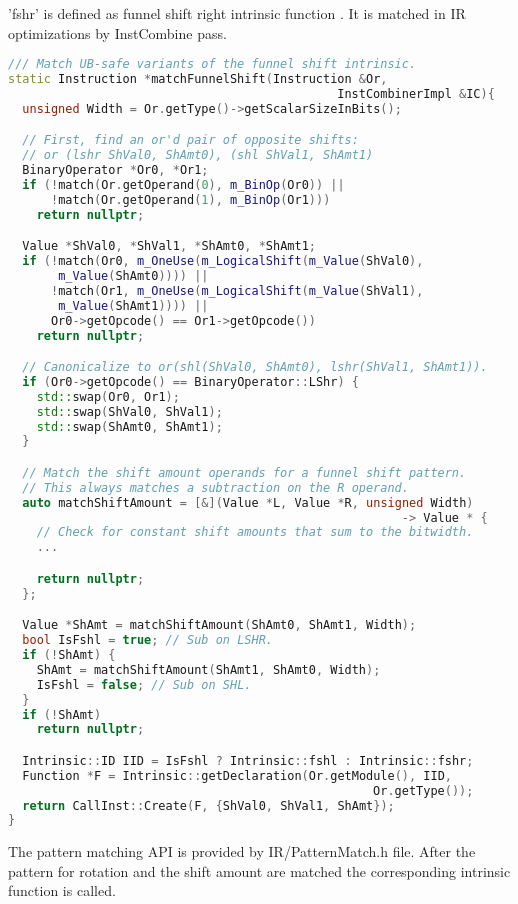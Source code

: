 'fshr' is defined as funnel shift right intrinsic function \cite{llvmref-fshl}. It is matched in IR optimizations by InstCombine pass.

\begin{lstlisting}[language=C++, caption={Funnel Shift Right Pattern Matching}]
/// Match UB-safe variants of the funnel shift intrinsic.
static Instruction *matchFunnelShift(Instruction &Or,
                                              InstCombinerImpl &IC){
  unsigned Width = Or.getType()->getScalarSizeInBits();

  // First, find an or'd pair of opposite shifts:
  // or (lshr ShVal0, ShAmt0), (shl ShVal1, ShAmt1)
  BinaryOperator *Or0, *Or1;
  if (!match(Or.getOperand(0), m_BinOp(Or0)) ||
      !match(Or.getOperand(1), m_BinOp(Or1)))
    return nullptr;

  Value *ShVal0, *ShVal1, *ShAmt0, *ShAmt1;
  if (!match(Or0, m_OneUse(m_LogicalShift(m_Value(ShVal0),
       m_Value(ShAmt0)))) ||
      !match(Or1, m_OneUse(m_LogicalShift(m_Value(ShVal1), 
       m_Value(ShAmt1)))) ||
      Or0->getOpcode() == Or1->getOpcode())
    return nullptr;

  // Canonicalize to or(shl(ShVal0, ShAmt0), lshr(ShVal1, ShAmt1)).
  if (Or0->getOpcode() == BinaryOperator::LShr) {
    std::swap(Or0, Or1);
    std::swap(ShVal0, ShVal1);
    std::swap(ShAmt0, ShAmt1);
  }

  // Match the shift amount operands for a funnel shift pattern. 
  // This always matches a subtraction on the R operand.
  auto matchShiftAmount = [&](Value *L, Value *R, unsigned Width) 
                                                       -> Value * {
    // Check for constant shift amounts that sum to the bitwidth.
    ...

    return nullptr;
  };

  Value *ShAmt = matchShiftAmount(ShAmt0, ShAmt1, Width);
  bool IsFshl = true; // Sub on LSHR.
  if (!ShAmt) {
    ShAmt = matchShiftAmount(ShAmt1, ShAmt0, Width);
    IsFshl = false; // Sub on SHL.
  }
  if (!ShAmt)
    return nullptr;

  Intrinsic::ID IID = IsFshl ? Intrinsic::fshl : Intrinsic::fshr;
  Function *F = Intrinsic::getDeclaration(Or.getModule(), IID,
                                                   Or.getType());
  return CallInst::Create(F, {ShVal0, ShVal1, ShAmt});
}
\end{lstlisting}

The pattern matching API is provided by IR/PatternMatch.h file. After the pattern for rotation and the shift amount are matched the corresponding intrinsic function is called. 

